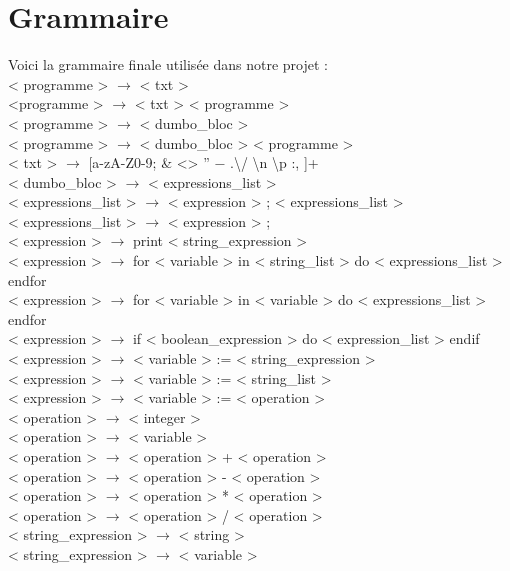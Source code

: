 \documentclass[a4paper,10pt]{article}
\begin{document}
\section{Grammaire}
Voici la grammaire finale utilisée dans notre projet : \\
< programme > $\rightarrow$ < txt > \\
<programme > $\rightarrow$ < txt > < programme > \\
< programme > $\rightarrow$ < dumbo\_bloc > \\
< programme > $\rightarrow$ < dumbo\_bloc > < programme > \\
< txt > $\rightarrow$ [a-zA-Z0-9; \& <> ” − .\textbackslash / \textbackslash n \textbackslash p :, ]+ \\
< dumbo\_bloc > $\rightarrow$ {{ < expressions\_list > }} \\
< expressions\_list > $\rightarrow$ < expression > ; < expressions\_list >\\
< expressions\_list > $\rightarrow$ < expression > ; \\
< expression > $\rightarrow$ print < string\_expression > \\
< expression > $\rightarrow$ for < variable > in < string\_list > do < expressions\_list > endfor \\
< expression > $\rightarrow$ for < variable > in < variable > do < expressions\_list > endfor \\
< expression > $\rightarrow$ if < boolean\_expression > do < expression\_list > endif\\
< expression > $\rightarrow$ < variable > := < string\_expression > \\
< expression > $\rightarrow$ < variable > := < string\_list > \\
< expression > $\rightarrow$ < variable > := < operation > \\
< operation > $\rightarrow$ < integer > \\
< operation > $\rightarrow$ < variable > \\
< operation > $\rightarrow$ < operation > + < operation >\\
< operation > $\rightarrow$ < operation > - < operation >\\
< operation > $\rightarrow$ < operation > * < operation >\\
< operation > $\rightarrow$ < operation > / < operation >\\
< string\_expression > $\rightarrow$ < string > \\
< string\_expression > $\rightarrow$ < variable > \\
\end{document}
